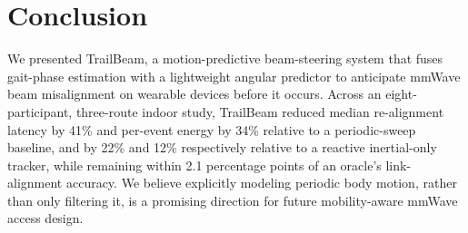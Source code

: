 \section{Conclusion}
We presented TrailBeam, a motion-predictive beam-steering system that fuses gait-phase estimation with a lightweight angular predictor to anticipate mmWave beam misalignment on wearable devices before it occurs. Across an eight-participant, three-route indoor study, TrailBeam reduced median re-alignment latency by 41\% and per-event energy by 34\% relative to a periodic-sweep baseline, and by 22\% and 12\% respectively relative to a reactive inertial-only tracker, while remaining within 2.1 percentage points of an oracle's link-alignment accuracy. We believe explicitly modeling periodic body motion, rather than only filtering it, is a promising direction for future mobility-aware mmWave access design.
